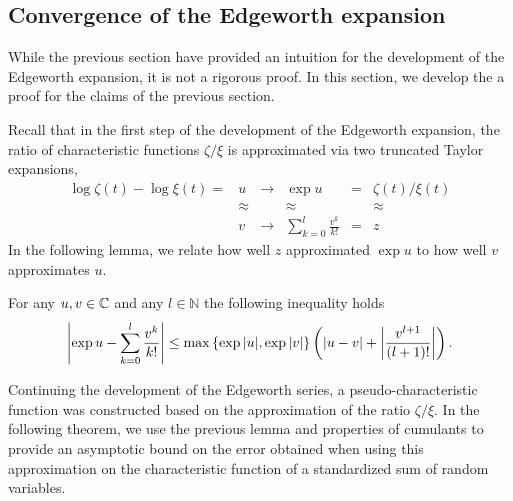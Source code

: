 \subsection{Convergence of the Edgeworth expansion}

While the previous section have provided an intuition for the development of the Edgeworth expansion, it is not a rigorous proof. In this section, we develop the a proof for the claims of the previous section.

Recall that in the first step of the development of the Edgeworth expansion, the ratio of characteristic functions $\zeta / \xi$ is approximated via two truncated Taylor expansions,
\begin{equation*}
    \begin{matrix}
        \log \zeta(t) - \log \xi(t) = & u & \longrightarrow & \exp u & = & \zeta(t) / \xi(t)\\
        &\approx & & \approx & & \approx \\
        &v  & \longrightarrow & \sum_{k=0}^l \frac{v^k}{k!} & = & z
    \end{matrix}
\end{equation*}
In the following lemma, we relate how well $z$ approximated $\exp u$ to how well $v$ approximates $u$.
\begin{lemma} \label{lemma-series}
    For any $u, v \in \mathbb{C}$ and any $l \in \mathbb{N}$ the following inequality holds
    \begin{equation}
        \left|\exp{u} - \sum_{k=0}^l \frac{v^k}{k!}\right| \leq \max \left\{ \exp{|u|}, \exp{|v|} \right\}\left(\left|u - v\right| + \left|\frac{v^{l+1}}{(l+1)!}\right|\right).
    \end{equation}
\end{lemma}


Continuing the development of the Edgeworth series, a pseudo-characteristic function was constructed based on the approximation of the ratio $\zeta / \xi$. In the following theorem, we use the previous lemma and properties of cumulants to provide an asymptotic bound on the error obtained when using this approximation on the characteristic function of a standardized sum of random variables. 

